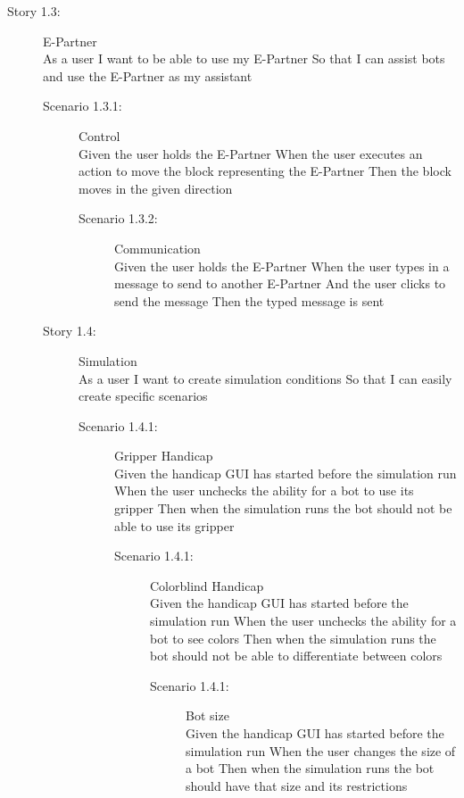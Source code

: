 \begin{description}
\item[Story 1.3:] E-Partner\\
As a user
I want to be able to use my E-Partner
So that I can assist bots and use the E-Partner as my assistant

\begin{description}
\item[Scenario 1.3.1:] Control\\
Given the user holds the E-Partner
When the user executes an action to move the block representing the E-Partner
Then the block moves in the given direction

\begin{description}
\item[Scenario 1.3.2:] Communication\\
Given the user holds the E-Partner
When the user types in a message to send to another E-Partner
And the user clicks to send the message
Then the typed message is sent

\end{description}
\end{description}

\begin{description}
\item[Story 1.4:] Simulation\\
As a user
I want to create simulation conditions
So that I can easily create specific scenarios
\begin{description}
\item[Scenario 1.4.1:] Gripper Handicap\\
Given the handicap GUI has started before the simulation run
When the user unchecks the ability for a bot to use its gripper
Then when the simulation runs the bot should not be able to use its gripper

\begin{description}
\item[Scenario 1.4.1:] Colorblind Handicap\\
Given the handicap GUI has started before the simulation run
When the user unchecks the ability for a bot to see colors
Then when the simulation runs the bot should not be able to differentiate between colors

\begin{description}
\item[Scenario 1.4.1:] Bot size\\
Given the handicap GUI has started before the simulation run
When the user changes the size of a bot
Then when the simulation runs the bot should have that size and its restrictions


\end{description}
\end{description}
\end{description}
\end{description}
\end{description}
